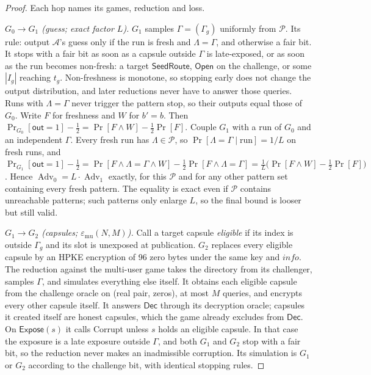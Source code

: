 \documentclass[pdflatex,sn-mathphys-num]{sn-jnl}
\theoremstyle{plain}
\theoremstyle{definition}
\newcommand{\Adv}{\operatorname{Adv}}
\begin{document}
\begin{proof}
Each hop names its games, reduction and loss.

\emph{$G_0\to G_1$ (guess; exact factor $L$).} $G_1$ samples $\Gamma=(\Gamma_g)$ uniformly from $\mathcal P$. Its rule: output $\mathcal A$'s guess only if the run is fresh and $\Lambda=\Gamma$, and otherwise a fair bit. It stops with a fair bit as soon as a capsule outside $\Gamma$ is late-exposed, or as soon as the run becomes non-fresh: a target $\mathsf{SeedRoute}$, $\mathsf{Open}$ on the challenge, or some $|I_g|$ reaching $t_g$. Non-freshness is monotone, so stopping early does not change the output distribution, and later reductions never have to answer those queries. Runs with $\Lambda=\Gamma$ never trigger the pattern stop, so their outputs equal those of $G_0$. Write $F$ for freshness and $W$ for $b'=b$. Then $\Pr_{G_0}[\mathsf{out}=1]-\tfrac12=\Pr[F\wedge W]-\tfrac12\Pr[F]$. Couple $G_1$ with a run of $G_0$ and an independent $\Gamma$. Every fresh run has $\Lambda\in\mathcal P$, so $\Pr[\Lambda=\Gamma\mid\text{run}]=1/L$ on fresh runs, and
$\Pr_{G_1}[\mathsf{out}=1]-\tfrac12=\Pr[F\wedge\Lambda{=}\Gamma\wedge W]-\tfrac12\Pr[F\wedge\Lambda{=}\Gamma]=\tfrac1L\big(\Pr[F\wedge W]-\tfrac12\Pr[F]\big)$.
Hence $\Adv_0=L\cdot\Adv_1$ exactly, for this $\mathcal P$ and for any other pattern set containing every fresh pattern. The equality is exact even if $\mathcal P$ contains unreachable patterns; such patterns only enlarge $L$, so the final bound is looser but still valid.

\emph{$G_1\to G_2$ (capsules; $\varepsilon_{\mathrm{mu}}(N,M)$).} Call a target capsule \emph{eligible} if its index is outside $\Gamma_g$ and its slot is unexposed at publication. $G_2$ replaces every eligible capsule by an HPKE encryption of 96 zero bytes under the same key and $\mathit{info}$. The reduction against the multi-user game takes the directory from its challenger, samples $\Gamma$, and simulates everything else itself. It obtains each eligible capsule from the challenge oracle on (real pair, zeros), at most $M$ queries, and encrypts every other capsule itself. It answers $\mathsf{Dec}$ through its decryption oracle; capsules it created itself are honest capsules, which the game already excludes from $\mathsf{Dec}$. On $\mathsf{Expose}(s)$ it calls Corrupt unless $s$ holds an eligible capsule. In that case the exposure is a late exposure outside $\Gamma$, and both $G_1$ and $G_2$ stop with a fair bit, so the reduction never makes an inadmissible corruption. Its simulation is $G_1$ or $G_2$ according to the challenge bit, with identical stopping rules.


\end{proof}
\end{document}

